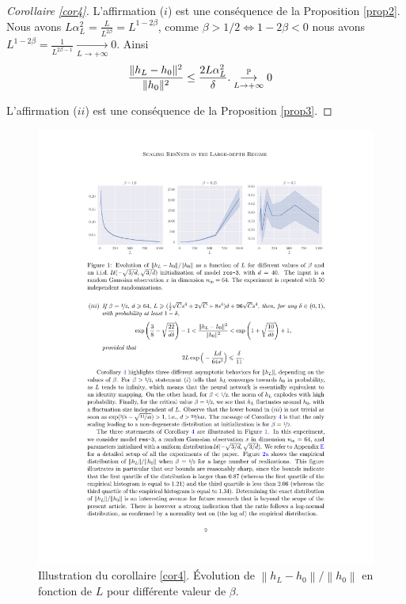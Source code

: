\begin{proof}[Corollaire \ref{cor4}]
    L'affirmation ($ i $) est une conséquence de la Proposition \ref{prop2}. Nous avons $ L \alpha _L ^2 = \frac{L}{L^{2\beta} } = L^{1 - 2 \beta } $, comme $ \beta > 1/2 \Leftrightarrow 1 - 2 \beta < 0 $ nous avons $ L^{1 - 2 \beta } = \frac{1}{L^{2 \beta  -1}} \underset{L\to +\infty}{\longrightarrow} 0 $. Ainsi
    \begin{align*}
        & \frac{\|h_L - h_0\|^2}{\|h_0\|^2} \leq \frac{2L\alpha_L^2}{\delta}.
        \overunderset{\mathbb{P}}{L\to +\infty}{\longrightarrow} 0 
    \end{align*}

    L'affirmation ($ ii $) est une conséquence de la Proposition \ref{prop3}.
\end{proof}

\begin{figure}[H]
    \centering
    \includegraphics[width=.95\textwidth]{figs/figure_cor4.pdf}
    \caption{Illustration du corollaire \ref{cor4}. Évolution de $ \left\| h_L - h_0 \right\| / \left\| h_0 \right\| $ en fonction de $ L $ pour différente valeur de $ \beta  $.}
    \label{fig:cor4}
\end{figure}

